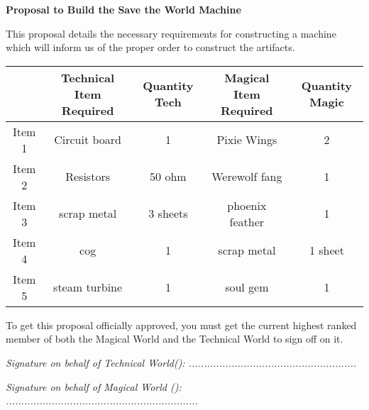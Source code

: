 \documentclass[white]{guildcamp3}
\begin{document}
\name{\wProposalAns{}} %
\large\textbf{Proposal to Build the Save the World Machine}  


This proposal details the necessary requirements for constructing a machine which will inform us of the proper order to construct the artifacts. 


\begin{tabular}{|c|c|c|c|c|}
	\hline \rule[-2ex]{0pt}{5.5ex}  & Technical Item Required & Quantity Tech & Magical Item Required & Quantity Magic \\ 
	\hline \rule[-2ex]{0pt}{5.5ex} Item 1 & Circuit board & 1 & Pixie Wings & 2 \\ 
	\hline \rule[-2ex]{0pt}{5.5ex} Item 2 & Resistors & 50 ohm & Werewolf fang & 1 \\ 
	\hline \rule[-2ex]{0pt}{5.5ex} Item 3 & scrap metal & 3 sheets & phoenix feather & 1 \\ 
	\hline \rule[-2ex]{0pt}{5.5ex} Item 4 & cog & 1 & scrap metal & 1 sheet \\ 
	\hline \rule[-2ex]{0pt}{5.5ex} Item 5 & steam turbine & 1 & soul gem & 1 \\ 
	\hline 
\end{tabular} 

To get this proposal officially approved, you must get the current highest ranked member of both the Magical World and the Technical World to sign off on it. 



\emph{Signature on behalf of Technical World(\cPoliOne{\intro}): .......................................................}

\emph{Signature on behalf of Magical World (\cNobleOne{\intro}): ...............................................................}


\end{document}

